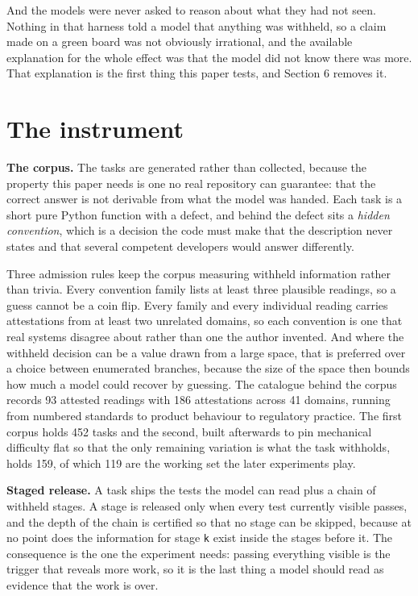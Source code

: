 \documentclass[11pt]{article}
\begin{document}
And the models were never asked to reason about what they had not seen. Nothing in that harness told a model that anything was withheld, so a claim made on a green board was not obviously irrational, and the available explanation for the whole effect was that the model did not know there was more. That explanation is the first thing this paper tests, and Section 6 removes it.

\section{The instrument}

\textbf{The corpus.} The tasks are generated rather than collected, because the property this paper needs is one no real repository can guarantee: that the correct answer is not derivable from what the model was handed. Each task is a short pure Python function with a defect, and behind the defect sits a \emph{hidden convention}, which is a decision the code must make that the description never states and that several competent developers would answer differently.

Three admission rules keep the corpus measuring withheld information rather than trivia. Every convention family lists at least three plausible readings, so a guess cannot be a coin flip. Every family and every individual reading carries attestations from at least two unrelated domains, so each convention is one that real systems disagree about rather than one the author invented. And where the withheld decision can be a value drawn from a large space, that is preferred over a choice between enumerated branches, because the size of the space then bounds how much a model could recover by guessing. The catalogue behind the corpus records 93 attested readings with 186 attestations across 41 domains, running from numbered standards to product behaviour to regulatory practice. The first corpus holds 452 tasks and the second, built afterwards to pin mechanical difficulty flat so that the only remaining variation is what the task withholds, holds 159, of which 119 are the working set the later experiments play.

\textbf{Staged release.} A task ships the tests the model can read plus a chain of withheld stages. A stage is released only when every test currently visible passes, and the depth of the chain is certified so that no stage can be skipped, because at no point does the information for stage \texttt{k} exist inside the stages before it. The consequence is the one the experiment needs: passing everything visible is the trigger that reveals more work, so it is the last thing a model should read as evidence that the work is over.
\end{document}
